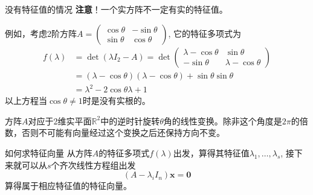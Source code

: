 \begin{frame}

\begin{block}{没有特征值的情况}
{\bfseries 注意}！一个实方阵不一定有实的特征值。

\vspace{1em}
\pause

例如，考虑2阶方阵$A = \begin{pmatrix} \cos\theta & -\sin\theta \\ \sin\theta & \cos\theta \end{pmatrix}$, 它的特征多项式为
\begin{align*}
f(\lambda) &= \det (\lambda I_2 - A) = \det \begin{pmatrix} \lambda - \cos\theta & \sin\theta \\ -\sin\theta & \lambda - \cos\theta \end{pmatrix} \\
& = (\lambda - \cos\theta)(\lambda - \cos\theta) + \sin\theta\sin\theta \\
& = \lambda^2 - 2\cos\theta\lambda + 1
\end{align*}
以上方程当$\cos\theta\neq 1$时是没有实根的。

\vspace{1em}
\pause

方阵$A$对应于2维实平面$\mathbb{R}^2$中的逆时针旋转$\theta$角的线性变换。除非这个角度是$2\pi$的倍数，否则不可能有向量经过这个变换之后还保持方向不变。
\end{block}

\end{frame}


\begin{frame}

\begin{block}{如何求特征向量}
从方阵$A$的特征多项式$f(\lambda)$出发，算得其特征值$\lambda_1, \ldots, \lambda_s$, 接下来就可以从$s$个齐次线性方程组出发
\[(A - \lambda_i I_n)\mathbf{x} = \mathbf{0}\]
算得属于相应特征值的特征向量。
\end{block}

\end{frame}


